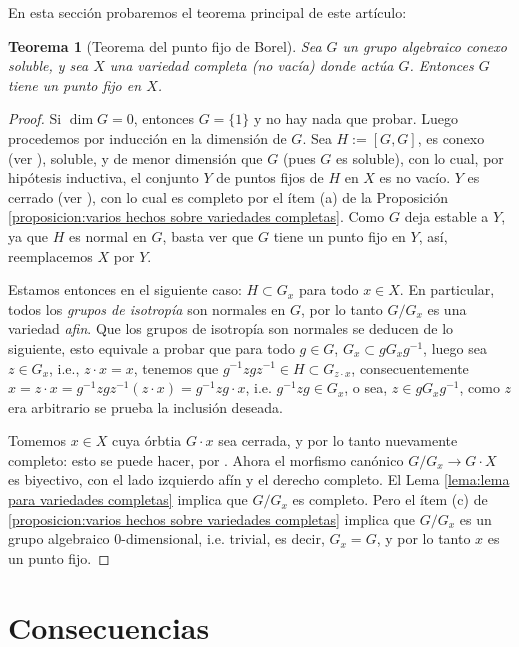 \documentclass[spanish,10pt]{amsart}
\newtheorem{theorem}{Teorema}[section]
\theoremstyle{definition}
\theoremstyle{remark}
\numberwithin{equation}{section}
\begin{document}
En esta sección probaremos el teorema principal de este artículo:

\begin{theorem}[Teorema del punto fijo de Borel]\label{teorema:punto fijo de borel}
Sea $G$ un grupo algebraico conexo soluble, y sea $X$ una variedad completa (no vacía) donde actúa $G$. Entonces $G$ tiene un punto fijo en $X$.
\end{theorem}
\begin{proof}
Si $\dim G = 0$, entonces $G = \{1\}$ y no hay nada que probar. Luego procedemos por inducción en la dimensión de $G$. Sea $H := [G, G]$, es conexo (ver \cite[(17.2)]{humphreys2012linearAlgebraicGroups}), soluble, y de menor dimensión que $G$ (pues $G$ es soluble), con lo cual, por hipótesis inductiva, el conjunto $Y$ de puntos fijos de $H$ en $X$ es no vacío. $Y$ es cerrado (ver \cite[Proposición 8.2.]{humphreys2012linearAlgebraicGroups}), con lo cual es completo por el ítem (a) de la Proposición \ref{proposicion:varios hechos sobre variedades completas}. Como $G$ deja estable a $Y$, ya que $H$ es normal en $G$, basta ver que $G$ tiene un punto fijo en $Y$, así, reemplacemos $X$ por $Y$.

Estamos entonces en el siguiente caso: $H \subset G_x$ para todo $x \in X$. En particular, todos los \textit{grupos de isotropía} son normales en $G$, por lo tanto $G/G_x$ es una variedad \textit{afin}. Que los grupos de isotropía son normales se deducen de lo siguiente, esto equivale a probar que para todo $g \in G$, $G_x \subset g G_x g^{-1}$, luego sea $z \in G_x$, i.e., $z \cdot x = x$, tenemos que $g^{-1}z g z^{-1} \in H \subset G_{z \cdot x}$, consecuentemente $x = z \cdot x = g^{-1} z g z^{-1} (z \cdot x) = g^{-1} z g \cdot x$, i.e. $g ^{-1} z g \in G_x$, o sea, $z \in g G_x g^{-1}$, como $z$ era arbitrario se prueba la inclusión deseada.

Tomemos $x \in X$ cuya órbtia $G \cdot x$ sea cerrada, y por lo tanto nuevamente completo: esto se puede hacer, por \cite[Proposición 8.3.]{humphreys2012linearAlgebraicGroups}. Ahora el morfismo canónico $G / G_x \to G \cdot X$ es biyectivo, con el lado izquierdo afín y el derecho completo. El Lema \ref{lema:lema para variedades completas} implica que $G/G_x$ es completo. Pero el ítem (c) de \ref{proposicion:varios hechos sobre variedades completas} implica que $G/G_x$ es un grupo algebraico $0$-dimensional, i.e. trivial, es decir, $G_x = G$, y por lo tanto $x$ es un punto fijo.
\end{proof}

\section{Consecuencias}
\end{document}
